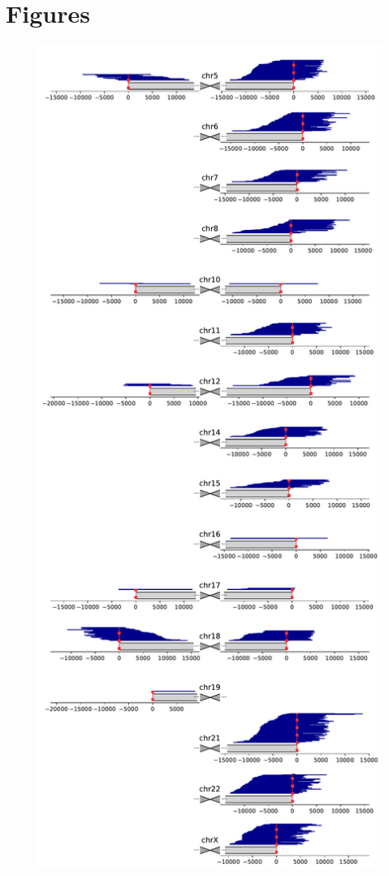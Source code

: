 \documentclass{article}
\begin{document}
\pagebreak
\section*{Figures} 

\begin{figure}[h!] \centering
\includegraphics[height=.85\textheight,width=\textwidth,keepaspectratio]{figures/HG002-alignment.pdf}

\end{figure}
\end{document}
